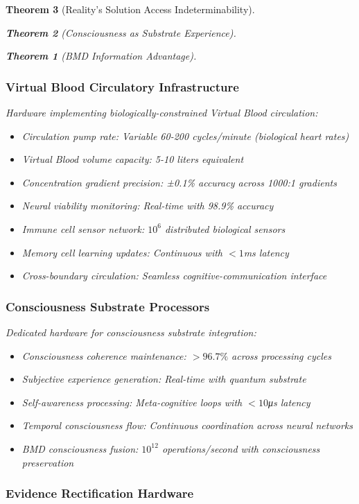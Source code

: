 \documentclass[12pt,a4paper]{article}
\newtheorem{theorem}{Theorem}[section]
\theoremstyle{remark}
\begin{document}
\begin{theorem}[Reality's Solution Access Indeterminability]
\begin{theorem}[Consciousness as Substrate Experience]
\begin{theorem}[BMD Information Advantage]
{{{\subsubsection{Virtual Blood Circulatory Infrastructure}

Hardware implementing biologically-constrained Virtual Blood circulation:

\begin{itemize}
\item Circulation pump rate: Variable 60-200 cycles/minute (biological heart rates)
\item Virtual Blood volume capacity: 5-10 liters equivalent
\item Concentration gradient precision: ±0.1\% accuracy across 1000:1 gradients
\item Neural viability monitoring: Real-time with 98.9\% accuracy
\item Immune cell sensor network: $10^6$ distributed biological sensors
\item Memory cell learning updates: Continuous with $<1$ms latency
\item Cross-boundary circulation: Seamless cognitive-communication interface
\end{itemize}

\subsubsection{Consciousness Substrate Processors}

Dedicated hardware for consciousness substrate integration:

\begin{itemize}
\item Consciousness coherence maintenance: $>96.7\%$ across processing cycles
\item Subjective experience generation: Real-time with quantum substrate
\item Self-awareness processing: Meta-cognitive loops with $<10$μs latency
\item Temporal consciousness flow: Continuous coordination across neural networks
\item BMD consciousness fusion: $10^{12}$ operations/second with consciousness preservation
\end{itemize}

\subsubsection{Evidence Rectification Hardware}

}}}
\end{theorem}
\end{theorem}
\end{theorem}
\end{document}
